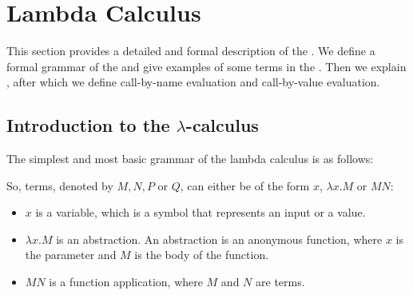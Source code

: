 


\chapter{Lambda Calculus}
This section provides a detailed and formal description of the \lc. We define a formal grammar of the \lc and give examples of some terms in the \lc.
Then we explain \br, after which we define call-by-name evaluation and call-by-value evaluation.


\section{\texorpdfstring{Introduction to the \boldmath$\lambda$-calculus}{Introduction to the Lambda Calculus}}
The simplest and most basic grammar of the lambda calculus is as follows:

\vspace{10pt}
\begin{grammar}{
	}
\end{grammar}

\vspace{10pt}
So, terms, denoted by $M, N, P$ or $Q$, can either be of the form $x$, $\lambda x.M$ or $M N$:
\begin{itemize}[noitemsep]
	\item $x$ is a variable, which is a symbol that represents an input or a value.
	\item $\lambda x.M$ is an abstraction. An abstraction is an anonymous function, where $x$ is the parameter and $M$ is the body of the function.
	\item $M N$ is a function application, where $M$ and $N$ are terms.
\end{itemize}

